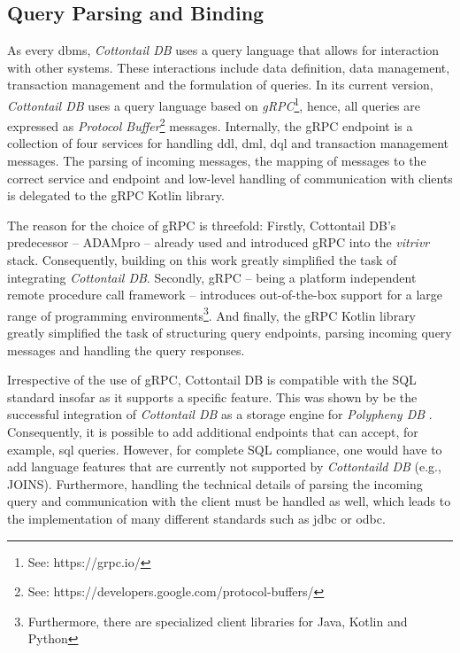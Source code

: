 \subsection{Query Parsing and Binding}
As every \acrshort{dbms}, \emph{Cottontail DB} uses a query language that allows for interaction with other systems. These interactions include data definition, data management, transaction management and the formulation of queries. In its current version, \emph{Cottontail DB} uses a query language based on \emph{gRPC}\footnote{See: https://grpc.io/}, hence, all queries are expressed as \emph{Protocol Buffer}\footnote{See: https://developers.google.com/protocol-buffers/} messages. Internally, the gRPC endpoint is a collection of four services for handling \acrshort{ddl}, \acrshort{dml}, \acrshort{dql} and transaction management messages. The parsing of incoming messages, the mapping of messages to the correct service and endpoint and low-level handling of communication with clients is delegated to the gRPC Kotlin library. 

The reason for the choice of gRPC is threefold: Firstly, Cottontail DB's predecessor -- ADAMpro -- already used and introduced gRPC into the \emph{vitrivr} stack. Consequently, building on this work greatly simplified the task of integrating \emph{Cottontail DB}. Secondly, gRPC -- being a platform independent remote procedure call framework -- introduces out-of-the-box support for a large range of programming environments\footnote{Furthermore, there are specialized client libraries for Java, Kotlin and Python}. And finally, the gRPC Kotlin library greatly simplified the task of structuring query endpoints, parsing incoming query messages and handling the query responses.

Irrespective of the use of gRPC, Cottontail DB is compatible with the SQL standard insofar as it supports a specific feature. This was shown by be the successful integration of \emph{Cottontail DB} as a storage engine for \emph{Polypheny DB} . Consequently, it is possible to add additional endpoints that can accept, for example, \acrshort{sql} queries. However, for complete SQL compliance, one would have to add language features that are currently not supported by \emph{Cottontaild DB} (e.g., JOINS). Furthermore, handling the technical details of parsing the incoming query and communication with the client must be handled as well, which leads to the implementation of many different standards such as \acrshort{jdbc} or \acrshort{odbc}.

